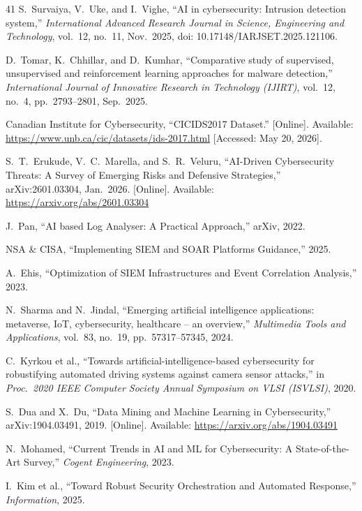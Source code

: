 \documentclass[12pt,a4paper]{report}
\begin{document}
\begin{thebibliography}{41}
S.\ Survaiya, V.\ Uke, and I.\ Vighe, ``AI in cybersecurity: Intrusion detection system,''
\textit{International Advanced Research Journal in Science, Engineering and Technology},
vol.\ 12, no.\ 11, Nov.\ 2025, doi: 10.17148/IARJSET.2025.121106.

D.\ Tomar, K.\ Chhillar, and D.\ Kumhar, ``Comparative study of supervised, unsupervised and
reinforcement learning approaches for malware detection,'' \textit{International Journal of
Innovative Research in Technology (IJIRT)}, vol.\ 12, no.\ 4, pp.\ 2793--2801, Sep.\ 2025.

Canadian Institute for Cybersecurity,
``CICIDS2017 Dataset.''
[Online]. Available:
\url{https://www.unb.ca/cic/datasets/ids-2017.html}
[Accessed: May 20, 2026].

S.\ T.\ Erukude, V.\ C.\ Marella, and S.\ R.\ Veluru, ``AI-Driven Cybersecurity Threats:
A Survey of Emerging Risks and Defensive Strategies,'' arXiv:2601.03304, Jan.\ 2026.
[Online]. Available: \url{https://arxiv.org/abs/2601.03304}

J.\ Pan, ``AI based Log Analyser: A Practical Approach,'' arXiv, 2022.

NSA \& CISA, ``Implementing SIEM and SOAR Platforms Guidance,'' 2025.

A.\ Ehis, ``Optimization of SIEM Infrastructures and Event Correlation Analysis,'' 2023.

N.\ Sharma and N.\ Jindal, ``Emerging artificial intelligence applications: metaverse, IoT,
cybersecurity, healthcare -- an overview,'' \textit{Multimedia Tools and Applications},
vol.\ 83, no.\ 19, pp.\ 57317--57345, 2024.

C.\ Kyrkou et al., ``Towards artificial-intelligence-based cybersecurity for robustifying
automated driving systems against camera sensor attacks,'' in \textit{Proc.\ 2020 IEEE
Computer Society Annual Symposium on VLSI (ISVLSI)}, 2020.

S.\ Dua and X.\ Du, ``Data Mining and Machine Learning in Cybersecurity,''
arXiv:1904.03491, 2019. [Online]. Available: \url{https://arxiv.org/abs/1904.03491}

N.\ Mohamed, ``Current Trends in AI and ML for Cybersecurity: A State-of-the-Art Survey,''
\textit{Cogent Engineering}, 2023.

I.\ Kim et al., ``Toward Robust Security Orchestration and Automated Response,''
\textit{Information}, 2025.


\end{thebibliography}
\end{document}
